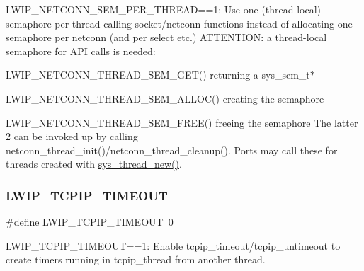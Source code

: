 L\+W\+I\+P\+\_\+\+N\+E\+T\+C\+O\+N\+N\+\_\+\+S\+E\+M\+\_\+\+P\+E\+R\+\_\+\+T\+H\+R\+E\+AD==1\+: Use one (thread-\/local) semaphore per thread calling socket/netconn functions instead of allocating one semaphore per netconn (and per select etc.) A\+T\+T\+E\+N\+T\+I\+ON\+: a thread-\/local semaphore for A\+PI calls is needed\+:
\begin{DoxyItemize}
\item L\+W\+I\+P\+\_\+\+N\+E\+T\+C\+O\+N\+N\+\_\+\+T\+H\+R\+E\+A\+D\+\_\+\+S\+E\+M\+\_\+\+G\+E\+T() returning a sys\+\_\+sem\+\_\+t$\ast$
\item L\+W\+I\+P\+\_\+\+N\+E\+T\+C\+O\+N\+N\+\_\+\+T\+H\+R\+E\+A\+D\+\_\+\+S\+E\+M\+\_\+\+A\+L\+L\+O\+C() creating the semaphore
\item L\+W\+I\+P\+\_\+\+N\+E\+T\+C\+O\+N\+N\+\_\+\+T\+H\+R\+E\+A\+D\+\_\+\+S\+E\+M\+\_\+\+F\+R\+E\+E() freeing the semaphore The latter 2 can be invoked up by calling netconn\+\_\+thread\+\_\+init()/netconn\+\_\+thread\+\_\+cleanup(). Ports may call these for threads created with \hyperlink{group__sys__misc_ga0d596afdd8dbcfad320172d39b0f607a}{sys\+\_\+thread\+\_\+new()}. 
\end{DoxyItemize}\mbox{\label{group__lwip__opts__netconn_ga1cd8d15a42262a0defaedabed126ea99}} 
\subsubsection{\texorpdfstring{L\+W\+I\+P\+\_\+\+T\+C\+P\+I\+P\+\_\+\+T\+I\+M\+E\+O\+UT}{LWIP\_TCPIP\_TIMEOUT}\hspace{0.1cm}{\footnotesize\ttfamily [1/2]}}
{\footnotesize\ttfamily \#define L\+W\+I\+P\+\_\+\+T\+C\+P\+I\+P\+\_\+\+T\+I\+M\+E\+O\+UT~0}

L\+W\+I\+P\+\_\+\+T\+C\+P\+I\+P\+\_\+\+T\+I\+M\+E\+O\+UT==1\+: Enable tcpip\+\_\+timeout/tcpip\+\_\+untimeout to create timers running in tcpip\+\_\+thread from another thread. \mbox{\label{group__lwip__opts__netconn_ga1cd8d15a42262a0defaedabed126ea99}} 
